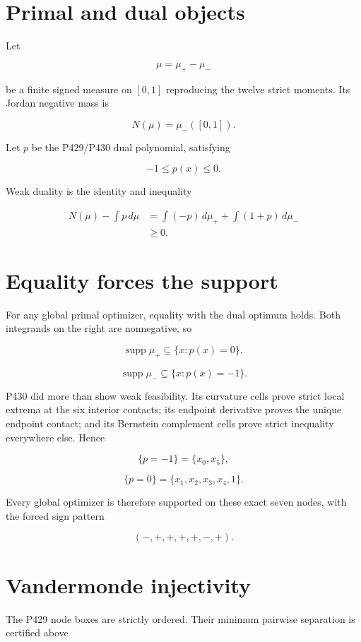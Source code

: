\documentclass[11pt,a4paper,openany]{report}
\begin{document}
\section{Primal and dual objects}

Let

\[
\mu=\mu_+-\mu_-
\]

be a finite signed measure on \([0,1]\) reproducing the twelve strict moments. Its Jordan negative mass is

\[
N(\mu)=\mu_-([0,1]).
\]

Let \(p\) be the P429/\allowbreak{}P430 dual polynomial, satisfying

\[
-1\le p(x)\le0.
\]

Weak duality is the identity and inequality

\[
\begin{aligned}
N(\mu)-\int p\,d\mu
&=\int(-p)\,d\mu_+
+\int(1+p)\,d\mu_-\\
&\ge0.
\end{aligned}
\]

\section{Equality forces the support}

For any global primal optimizer, equality with the dual optimum holds. Both integrands on the right are nonnegative, so

\[
\operatorname{supp}\mu_+\subseteq\{x:p(x)=0\},
\]

\[
\operatorname{supp}\mu_-\subseteq\{x:p(x)=-1\}.
\]

P430 did more than show weak feasibility. Its curvature cells prove strict local extrema at the six interior contacts; its endpoint derivative proves the unique endpoint contact; and its Bernstein complement cells prove strict inequality everywhere else. Hence

\[
\{p=-1\}=\{x_0,x_5\},
\]

\[
\{p=0\}=\{x_1,x_2,x_3,x_4,1\}.
\]

Every global optimizer is therefore supported on these exact seven nodes, with the forced sign pattern

\[
(-,+,+,+,+,-,+).
\]

\section{Vandermonde injectivity}

The P429 node boxes are strictly ordered. Their minimum pairwise separation is certified above
\end{document}

